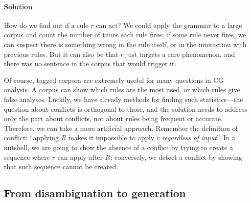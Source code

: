 
\paragraph{Solution}

How do we find out if a rule $r$ can act? 
We could apply the grammar to a large corpus and count the number of times 
each rule fires; if some rule never fires, we can suspect there is something wrong 
in the rule itself, or in the interaction with previous rules. 
But it can also be that $r$ just targets a rare phenomenon, and there was no sentence in the corpus that would trigger it.

Of course, tagged corpora are extremely useful for many questions in CG analysis.
A corpus can show which rules are the most used, or which rules give false analyses. 
Luckily, we have already methods for finding such statistics---the question 
about conflicts is orthogonal to those, and the solution needs to address only 
the part about conflicts, not about rules being frequent or accurate.
Therefore, we can take a more artificial approach. %
Remember the definition of conflict: ``applying $R$ makes it impossible to apply $r$ \emph{regardless of input}''.
In a nutshell, we are going to show the absence of a conflict by trying to create 
a sequence where $r$ can apply after $R$; conversely, we detect a conflict by 
showing that such sequence cannot be created.




\def\newVar{$\text{\em word}'_\textsc{ RD}$}
\def\oldVar{$\text{\em word}_\textsc{\,RD}$}
\def\eqdef{\Coloneqq}
\def\invConds{\text{invalid condition}}
\def\onlyTrgLeft{\text{only target left}}

\subsection{From disambiguation to generation}

